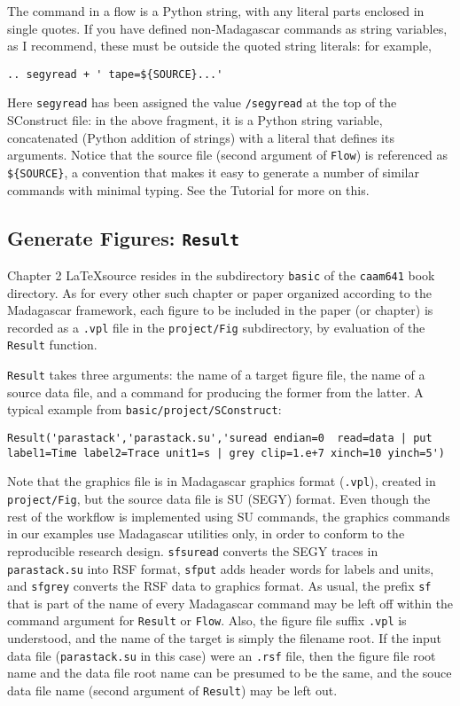 The command in a flow is a Python string, with any literal parts enclosed in single quotes. If you have defined non-Madagascar commands as string variables, as I recommend, these must be outside the quoted string literals: for example,
\begin{verbatim}
.. segyread + ' tape=${SOURCE}...'
\end{verbatim}
Here {\tt segyread} has been assigned the value {\tt<path to CWP bin dir>/segyread} at the top of the SConstruct file: in the above fragment, it is a Python string variable, concatenated (Python addition of strings) with a literal that defines its arguments. Notice that the source file (second argument of {\tt Flow}) is referenced as {\tt \$\{SOURCE\}}, a convention that makes it easy to generate a number of similar commands with minimal typing. See the Tutorial for more on this. 

\subsection{Generate Figures: {\tt Result}}
Chapter 2 \LaTeX source resides in the subdirectory {\tt basic} of the {\tt caam641} book directory.
As for every other such chapter or paper organized according to the Madagascar framework, each figure to be included in the paper (or chapter) is recorded as a {\tt .vpl} file in the {\tt project/Fig} subdirectory, by evaluation of the {\tt Result} function. 

{\tt Result} takes three arguments: the name of a target figure file, the name of a source data file, and a command for producing the former from the latter. 
A typical example from {\tt basic/project/SConstruct}: 
\begin{verbatim}
Result('parastack','parastack.su','suread endian=0  read=data | put label1=Time label2=Trace unit1=s | grey clip=1.e+7 xinch=10 yinch=5')
\end{verbatim}
Note that the graphics file is in Madagascar graphics format ({\tt .vpl}), created in {\tt project/Fig}, but the source data file is SU (SEGY) format. Even though the rest of the workflow is implemented using SU commands, the graphics commands in our examples use Madagascar utilities only, in order to conform to the reproducible research design. {\tt sfsuread} converts the SEGY traces in {\tt parastack.su} into RSF format, {\tt sfput} adds header words for labels and units, and {\tt sfgrey} converts the RSF data to graphics format. As usual, the prefix {\tt sf} that is part of the name of every Madagascar command may be left off within the command argument for {\tt Result} or {\tt Flow}. Also, the figure file suffix {\tt .vpl} is understood, and the name of the target is simply the filename root. If the input data file ({\tt parastack.su} in this case) were an {\tt .rsf} file, then the figure file root name and the data file root name can be presumed to be the same, and the souce data file name (second argument of {\tt Result}) may be left out.

